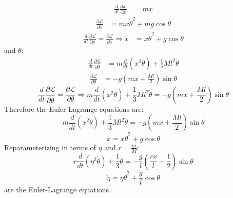 \documentclass[9pt]{report}
\begin{document}
\begin{enumerate}
\[\begin{align}
\frac{d}{dt} \frac{\partial \mathcal{L}}{\partial\dot{x}} &= m \ddot{x}
\end{align}
\]
\[
\begin{align}
\frac{\partial \mathcal{L}}{\partial x} &= m x \dot{\theta}^2 + mg\cos\theta
\end{align}
\]
\[
\begin{align}
 \frac{d}{dt} \frac{\partial \mathcal{L}}{\partial\dot{x}} = \frac{\partial \mathcal{L}}{\partial x} \Rightarrow \ddot{x} &= x \dot{\theta}^2 + g \cos \theta
\end{align}
\]
and $\theta$:
\[
\begin{align}
\frac{d}{dt} \frac{\partial \mathcal{L}}{\partial\dot{\theta}} &= m \frac{d}{dt}(x^2\dot{\theta}) + \frac{1}{3} Ml^2 \ddot{\theta}
\end{align}
\]
\[
\begin{align}
\frac{\partial \mathcal{L}}{\partial \theta} &= -g (mx + \frac{Ml}{2}) \sin \theta
\end{align}
\]
\[
\frac{d}{dt} \frac{\partial \mathcal{L}}{\partial\dot{\theta}} = \frac{\partial \mathcal{L}}{\partial \theta} \Rightarrow m \frac{d}{dt}(x^2\dot{\theta}) + \frac{1}{3} Ml^2 \ddot{\theta}
= -g(mx + \frac{Ml}{2}) \sin \theta
\]
Therefore the Euler Lagrange equations are:
\[
m \frac{d}{dt}(x^2\dot{\theta}) + \frac{1}{3} Ml^2 \ddot{\theta} = -g (mx + \frac{Ml}{2}) \sin \theta \label{el_theta}
\]
\[
\ddot{x} = x \dot{\theta}^2 \label{el_x} + g \cos \theta
\]
Reparameterizing in terms of $\eta$ and $r=\frac{m}{M}$:
\begin{equation}
r \frac{d}{dt}(\eta^2\dot{\theta}) + \frac{1}{3}\ddot{\theta} = -\frac{g}{l} (\frac{rx}{l} + \frac{1}{2}) \sin \theta \label{el_eta}
\end{equation}
\begin{equation}
\ddot{\eta} = \eta \dot{\theta}^2 \label{el_theta} + \frac{g}{l}\cos \theta
\end{equation}
are the Euler-Lagrange equations.


\end{enumerate}
\end{document}

